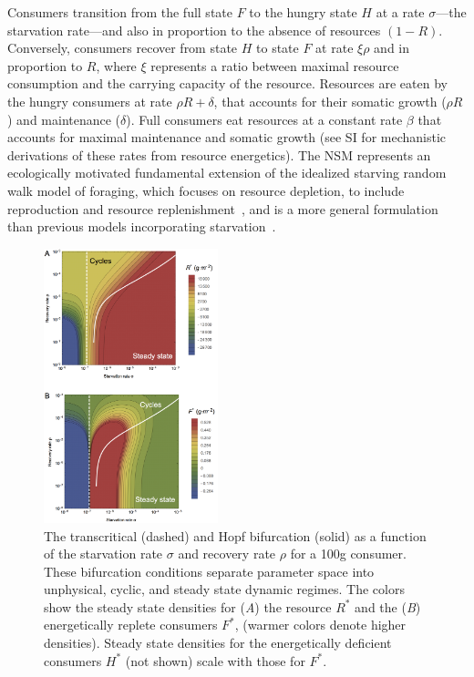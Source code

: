\documentclass[twocolumn,preprintnumbers,amsmath,amssymb,superscriptaddress]{revtex4}
\begin{document}
\begin{bibunit}[unsrt]
Consumers transition from the full state $F$ to the hungry state $H$ at a rate $\sigma$---the starvation rate---and also in proportion to the absence of resources $(1-R)$.  Conversely, consumers recover from state $H$ to state $F$ at rate $\xi \rho$ and in proportion to $R$, where $\xi$ represents a ratio between maximal resource consumption and the carrying capacity of the resource. %
Resources are eaten by the hungry consumers at rate $\rho R + \delta$, that accounts for their somatic growth ($\rho R$) and  maintenance ($\delta$). Full consumers eat resources at a constant rate $\beta$ that accounts for maximal maintenance and somatic growth (see SI for mechanistic derivations of these rates from resource energetics).
The NSM represents an ecologically motivated fundamental extension of the idealized starving random walk model of foraging, which focuses on resource depletion, to include reproduction and resource replenishment~\cite{Benichou:2014wu,Benichou:2016wl,Chupeau:2016jf}, and is a more general formulation than previous models incorporating starvation~\cite{Persson:1998hz}.



\begin{figure}
\centering
\includegraphics[width=0.45\textwidth]{fig_FixedPoint.png}
\caption{ The transcritical (dashed) and Hopf bifurcation (solid) as a
  function of the starvation rate $\sigma$ and recovery rate $\rho$ for a 100g consumer.  These
  bifurcation conditions separate parameter space into unphysical, cyclic,
  and steady state dynamic regimes.  The colors show the steady
  state densities for (\emph{A}) the resource $R^*$ and the (\emph{B}) energetically
  replete consumers $F^*$, (warmer colors denote higher densities).  Steady
  state densities for the energetically deficient consumers $H^*$ (not shown)
  scale with those for $F^*$.  }
\label{fig:fp}
\end{figure}




\end{bibunit}
\end{document}
